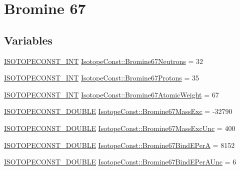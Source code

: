 \hypertarget{group___isotope_const-_bromine-_br67}{}\section{Bromine 67}
\label{group___isotope_const-_bromine-_br67}
\subsection*{Variables}
\begin{DoxyCompactItemize}
\item 
\mbox{\hyperlink{group___isotope_const-_macros_ga5f18360b3e99483a35c32d789e62621c}{I\+S\+O\+T\+O\+P\+E\+C\+O\+N\+S\+T\+\_\+\+I\+NT}} \mbox{\hyperlink{group___isotope_const-_bromine-_br67_ga497b0b75ba98beef03b190e081928bd3}{Isotope\+Const\+::\+Bromine67\+Neutrons}} = 32
\item 
\mbox{\hyperlink{group___isotope_const-_macros_ga5f18360b3e99483a35c32d789e62621c}{I\+S\+O\+T\+O\+P\+E\+C\+O\+N\+S\+T\+\_\+\+I\+NT}} \mbox{\hyperlink{group___isotope_const-_bromine-_br67_ga7f48cc4704d4db8d6802aa6083db6078}{Isotope\+Const\+::\+Bromine67\+Protons}} = 35
\item 
\mbox{\hyperlink{group___isotope_const-_macros_ga5f18360b3e99483a35c32d789e62621c}{I\+S\+O\+T\+O\+P\+E\+C\+O\+N\+S\+T\+\_\+\+I\+NT}} \mbox{\hyperlink{group___isotope_const-_bromine-_br67_ga37188ff4e5e40f5c410fe839e5f37e89}{Isotope\+Const\+::\+Bromine67\+Atomic\+Weight}} = 67
\item 
\mbox{\hyperlink{group___isotope_const-_macros_ga8f45a7272ce02c0b4c65c44636ed719a}{I\+S\+O\+T\+O\+P\+E\+C\+O\+N\+S\+T\+\_\+\+D\+O\+U\+B\+LE}} \mbox{\hyperlink{group___isotope_const-_bromine-_br67_ga012a6e3ffb67be861165baaf56ac53e9}{Isotope\+Const\+::\+Bromine67\+Mass\+Exc}} = -\/32790
\item 
\mbox{\hyperlink{group___isotope_const-_macros_ga8f45a7272ce02c0b4c65c44636ed719a}{I\+S\+O\+T\+O\+P\+E\+C\+O\+N\+S\+T\+\_\+\+D\+O\+U\+B\+LE}} \mbox{\hyperlink{group___isotope_const-_bromine-_br67_ga49f6bc01baef82af39c178c78abc8ae3}{Isotope\+Const\+::\+Bromine67\+Mass\+Exc\+Unc}} = 400
\item 
\mbox{\hyperlink{group___isotope_const-_macros_ga8f45a7272ce02c0b4c65c44636ed719a}{I\+S\+O\+T\+O\+P\+E\+C\+O\+N\+S\+T\+\_\+\+D\+O\+U\+B\+LE}} \mbox{\hyperlink{group___isotope_const-_bromine-_br67_ga09239e1d161950a16f5ce8e74e65bd11}{Isotope\+Const\+::\+Bromine67\+Bind\+E\+PerA}} = 8152
\item 
\mbox{\hyperlink{group___isotope_const-_macros_ga8f45a7272ce02c0b4c65c44636ed719a}{I\+S\+O\+T\+O\+P\+E\+C\+O\+N\+S\+T\+\_\+\+D\+O\+U\+B\+LE}} \mbox{\hyperlink{group___isotope_const-_bromine-_br67_ga8f1b45f7d4770e7ca11c41f2e57fae4d}{Isotope\+Const\+::\+Bromine67\+Bind\+E\+Per\+A\+Unc}} = 6

\end{DoxyCompactItemize}
